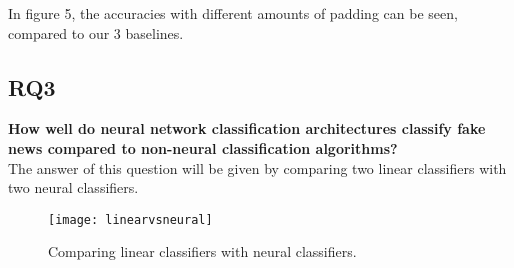 In figure 5, the accuracies with different amounts of padding can be seen, compared to our 3 baselines.

\subsection{RQ3}
\textbf{How well do neural network classification architectures classify fake news compared to non-neural classification algorithms?}\\
The answer of this question will be given by comparing two linear classifiers with two neural classifiers. 

\begin{figure}[h]
    \centering
    \texttt{[image: linearvsneural]}
    \caption{Comparing linear classifiers with neural classifiers.}
\end{figure}

\pagebreak